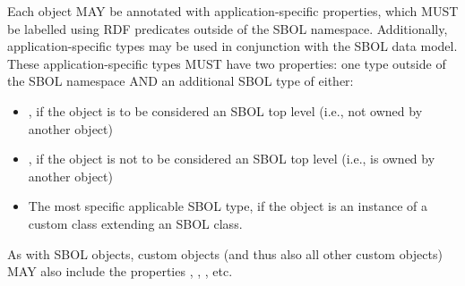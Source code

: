 Each  object MAY be annotated with application-specific properties, which MUST be labelled using RDF predicates outside of the SBOL namespace.  Additionally, application-specific types may be used in conjunction with the SBOL data model. These application-specific types MUST have two  properties: one type outside of the SBOL namespace AND an additional SBOL type of either:

\begin{itemize}
  \item {}, if the object is to be considered an SBOL top level (i.e., not owned by another object)
  \item {}, if the object is not to be considered an SBOL top level (i.e., is owned by another object)
  \item The most specific applicable SBOL type, if the object is an instance of a custom class extending an SBOL class.
\end{itemize}

As with SBOL  objects, custom  objects (and thus also all other custom objects) MAY also include the properties , , , etc. 
